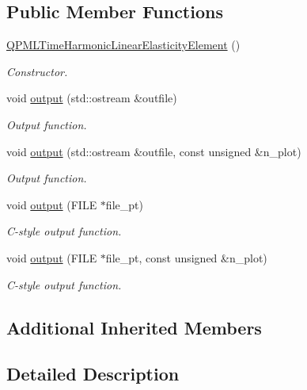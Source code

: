 \subsection*{Public Member Functions}
\begin{DoxyCompactItemize}
\item 
\hyperlink{classoomph_1_1QPMLTimeHarmonicLinearElasticityElement_a415ccbbe94e6f67931701229f8cb9cd6}{Q\+P\+M\+L\+Time\+Harmonic\+Linear\+Elasticity\+Element} ()
\begin{DoxyCompactList}\small\item\em Constructor. \end{DoxyCompactList}\item 
void \hyperlink{classoomph_1_1QPMLTimeHarmonicLinearElasticityElement_a810b433071811f8f79e998e6f418e7fb}{output} (std\+::ostream \&outfile)
\begin{DoxyCompactList}\small\item\em Output function. \end{DoxyCompactList}\item 
void \hyperlink{classoomph_1_1QPMLTimeHarmonicLinearElasticityElement_a6cb8fd016cd38ff92b4152ebf3ca00d1}{output} (std\+::ostream \&outfile, const unsigned \&n\+\_\+plot)
\begin{DoxyCompactList}\small\item\em Output function. \end{DoxyCompactList}\item 
void \hyperlink{classoomph_1_1QPMLTimeHarmonicLinearElasticityElement_a9eb0c961540da01cd8a8ff04eefa5c9f}{output} (F\+I\+LE $\ast$file\+\_\+pt)
\begin{DoxyCompactList}\small\item\em C-\/style output function. \end{DoxyCompactList}\item 
void \hyperlink{classoomph_1_1QPMLTimeHarmonicLinearElasticityElement_a0065cae9f58583e0354aa00cbe6122af}{output} (F\+I\+LE $\ast$file\+\_\+pt, const unsigned \&n\+\_\+plot)
\begin{DoxyCompactList}\small\item\em C-\/style output function. \end{DoxyCompactList}\end{DoxyCompactItemize}
\subsection*{Additional Inherited Members}


\subsection{Detailed Description}

